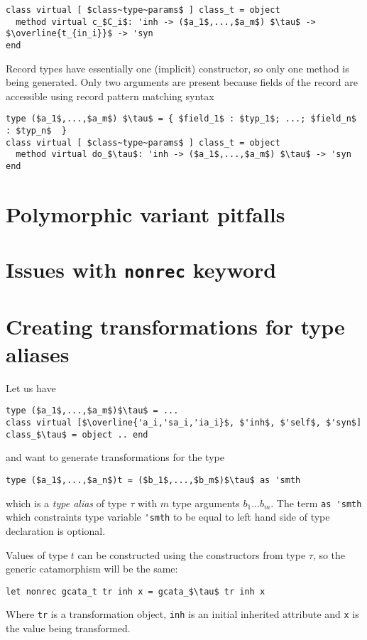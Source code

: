 \documentclass[acmsmall,review,anonymous]{acmart}\settopmatter{printfolios=true,printccs=false,printacmref=false}
\let\listinline\lstinline
\begin{document}
\begin{lstlisting}
class virtual [ $class~type~params$ ] class_t = object
  method virtual c_$C_i$: 'inh -> ($a_1$,...,$a_m$) $\tau$ -> $\overline{t_{in_i}}$ -> 'syn
end
\end{lstlisting}

Record types have essentially one (implicit) constructor, so only one method is being generated. Only two arguments are present because fields of the record are accessible using record pattern matching syntax
\begin{lstlisting}
type ($a_1$,...,$a_m$) $\tau$ = { $field_1$ : $typ_1$; ...; $field_n$ : $typ_n$  }
class virtual [ $class~type~params$ ] class_t = object
  method virtual do_$\tau$: 'inh -> ($a_1$,...,$a_m$) $\tau$ -> 'syn
end
\end{lstlisting}

\section{Polymorphic variant pitfalls}
\label{sec:polypitfalls}

\section{Issues with \listinline=nonrec= keyword}
\label{sec:nonrecpitfalls}

\section{Creating transformations for type aliases}
\label{sec:typealiases}
Let us have
\begin{lstlisting}
type ($a_1$,...,$a_m$)$\tau$ = ...
class virtual [$\overline{'a_i,'sa_i,'ia_i}$, $'inh$, $'self$, $'syn$] class_$\tau$ = object .. end
\end{lstlisting}
and want to generate transformations for the type
\begin{lstlisting}
type ($a_1$,...,$a_n$)t = ($b_1$,...,$b_m$)$\tau$ as 'smth
\end{lstlisting}
which is a \textit{type alias} of type $\tau$ with $m$ type arguments $b_1$...$b_m$. The term \lstinline{as 'smth} which constraints type variable \lstinline{'smth} to be equal to left hand side of type declaration is optional.

Values of type $t$ can be constructed using the constructors from type $\tau$, so the generic catamorphism will be the same:
\begin{lstlisting}
let nonrec gcata_t tr inh x = gcata_$\tau$ tr inh x
\end{lstlisting}
Where \lstinline{tr} is a transformation object, \lstinline{inh} is an initial inherited attribute and \lstinline{x} is the value being transformed.
\end{document}
